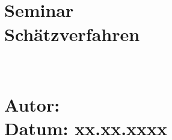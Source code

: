 \section*{
\vspace{4.5cm}
{\huge \\ 
Seminar  \\
Schätzverfahren   \vspace{1.5cm}\\ 
\ifrtitleOne \\
\ifrtitleTwo \\
\vspace{4.3cm} 
} 
{\normalsize
Autor: \ifrauthor \\
Datum: xx.xx.xxxx
}
}
